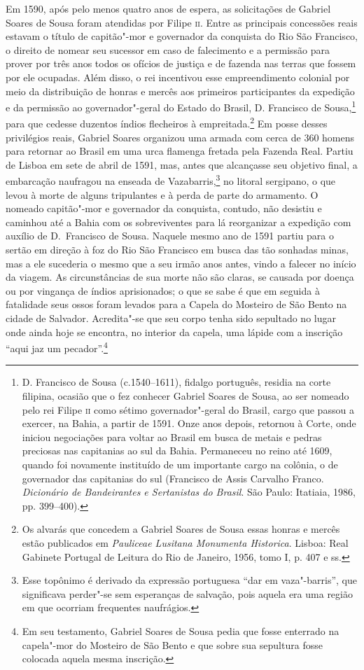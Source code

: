  Em 1590, após pelo menos quatro anos de espera, as solicitações de
Gabriel Soares de Sousa foram atendidas por Filipe \textsc{ii}. Entre as
principais concessões reais estavam o título de capitão"-mor e
governador da conquista do Rio São Francisco, o direito de nomear seu
sucessor em caso de falecimento e a permissão para prover por três anos
todos os ofícios de justiça e de fazenda nas terras que fossem por ele
ocupadas. Além disso, o rei incentivou esse empreendimento colonial por
meio da distribuição de honras e mercês aos primeiros participantes da
expedição e da permissão ao governador"-geral do Estado do Brasil, D.
Francisco de Sousa,\footnote{ D. Francisco de Sousa (c.1540--1611),
fidalgo português, residia na corte filipina, ocasião que o fez
conhecer Gabriel Soares de Sousa, ao ser nomeado pelo rei Filipe 	\textsc{ii}
como sétimo governador"-geral do Brasil, cargo que passou a exercer, na
Bahia, a partir de 1591. Onze anos depois, retornou à Corte, onde
iniciou negociações para voltar ao Brasil em busca de metais e pedras
preciosas nas capitanias ao sul da Bahia. Permaneceu no reino até 1609,
quando foi novamente instituído de um importante cargo na colônia, o de
governador das capitanias do sul (Francisco de Assis Carvalho Franco.
\textit{Dicionário de Bandeirantes e Sertanistas do Brasil}. São Paulo:
Itatiaia, 1986, pp. 399--400).} para que cedesse duzentos índios
flecheiros à empreitada.\footnote{ Os alvarás que concedem a Gabriel
Soares de Sousa essas honras e mercês estão publicados em\textit{
Pauliceae Lusitana Monumenta Historica}. Lisboa: Real Gabinete Portugal
de Leitura do Rio de Janeiro, 1956, tomo I, p. 407 e ss.} Em posse
desses privilégios reais, Gabriel Soares organizou uma armada com cerca
de 360 homens para retornar ao Brasil em uma urca
flamenga fretada pela Fazenda Real. Partiu de Lisboa em sete de abril
de 1591, mas, antes que alcançasse seu objetivo final, a embarcação
naufragou na enseada de Vazabarris,\footnote{ Esse topônimo é derivado
da expressão portuguesa “dar em vaza"-barris”, que significava perder"-se
sem esperanças de salvação, pois aquela era uma região em que ocorriam
frequentes naufrágios.} no litoral sergipano, o que levou à morte de
alguns tripulantes e à perda de parte do armamento. O nomeado
capitão"-mor e governador da conquista, contudo, não desistiu e caminhou
até a Bahia com os sobreviventes para lá reorganizar a expedição com
auxílio de D.~Francisco de Sousa. Naquele mesmo ano de 1591 partiu para
o sertão em direção à foz do Rio São Francisco em busca das tão
sonhadas minas, mas a ele sucederia o mesmo que a seu irmão anos antes,
vindo a falecer no início da viagem. As circunstâncias de sua morte não
são claras, se causada por doença ou por vingança de índios
aprisionados; o que se sabe é que em seguida à fatalidade seus ossos
foram levados para a Capela do Mosteiro de São Bento na cidade de
Salvador. Acredita"-se que seu corpo tenha sido sepultado no lugar onde
ainda hoje se encontra, no interior da capela, uma lápide com a
inscrição ``aqui jaz um pecador''.\footnote{ Em seu
testamento, Gabriel Soares de Sousa pedia que fosse enterrado na 
capela"-mor do Mosteiro de São Bento e que sobre sua sepultura fosse colocada
aquela mesma inscrição.}

